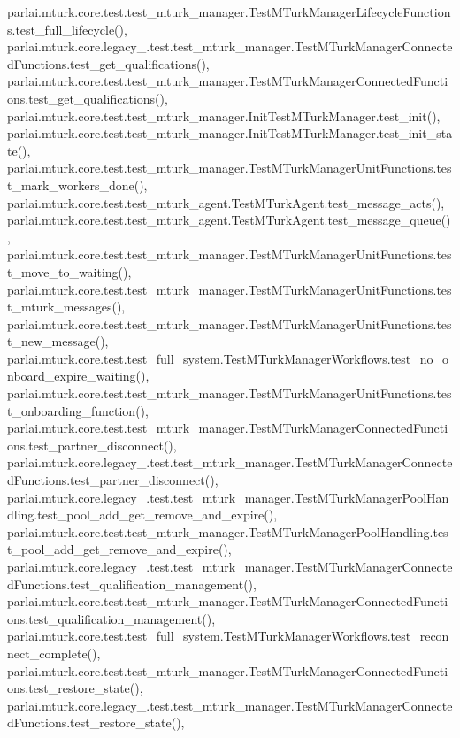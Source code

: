 parlai.\+mturk.\+core.\+test.\+test\+\_\+mturk\+\_\+manager.\+Test\+M\+Turk\+Manager\+Lifecycle\+Functions.\+test\+\_\+full\+\_\+lifecycle(), parlai.\+mturk.\+core.\+legacy\+\_.\+test.\+test\+\_\+mturk\+\_\+manager.\+Test\+M\+Turk\+Manager\+Connected\+Functions.\+test\+\_\+get\+\_\+qualifications(), parlai.\+mturk.\+core.\+test.\+test\+\_\+mturk\+\_\+manager.\+Test\+M\+Turk\+Manager\+Connected\+Functions.\+test\+\_\+get\+\_\+qualifications(), parlai.\+mturk.\+core.\+test.\+test\+\_\+mturk\+\_\+manager.\+Init\+Test\+M\+Turk\+Manager.\+test\+\_\+init(), parlai.\+mturk.\+core.\+test.\+test\+\_\+mturk\+\_\+manager.\+Init\+Test\+M\+Turk\+Manager.\+test\+\_\+init\+\_\+state(), parlai.\+mturk.\+core.\+test.\+test\+\_\+mturk\+\_\+manager.\+Test\+M\+Turk\+Manager\+Unit\+Functions.\+test\+\_\+mark\+\_\+workers\+\_\+done(), parlai.\+mturk.\+core.\+test.\+test\+\_\+mturk\+\_\+agent.\+Test\+M\+Turk\+Agent.\+test\+\_\+message\+\_\+acts(), parlai.\+mturk.\+core.\+test.\+test\+\_\+mturk\+\_\+agent.\+Test\+M\+Turk\+Agent.\+test\+\_\+message\+\_\+queue(), parlai.\+mturk.\+core.\+test.\+test\+\_\+mturk\+\_\+manager.\+Test\+M\+Turk\+Manager\+Unit\+Functions.\+test\+\_\+move\+\_\+to\+\_\+waiting(), parlai.\+mturk.\+core.\+test.\+test\+\_\+mturk\+\_\+manager.\+Test\+M\+Turk\+Manager\+Unit\+Functions.\+test\+\_\+mturk\+\_\+messages(), parlai.\+mturk.\+core.\+test.\+test\+\_\+mturk\+\_\+manager.\+Test\+M\+Turk\+Manager\+Unit\+Functions.\+test\+\_\+new\+\_\+message(), parlai.\+mturk.\+core.\+test.\+test\+\_\+full\+\_\+system.\+Test\+M\+Turk\+Manager\+Workflows.\+test\+\_\+no\+\_\+onboard\+\_\+expire\+\_\+waiting(), parlai.\+mturk.\+core.\+test.\+test\+\_\+mturk\+\_\+manager.\+Test\+M\+Turk\+Manager\+Unit\+Functions.\+test\+\_\+onboarding\+\_\+function(), parlai.\+mturk.\+core.\+test.\+test\+\_\+mturk\+\_\+manager.\+Test\+M\+Turk\+Manager\+Connected\+Functions.\+test\+\_\+partner\+\_\+disconnect(), parlai.\+mturk.\+core.\+legacy\+\_.\+test.\+test\+\_\+mturk\+\_\+manager.\+Test\+M\+Turk\+Manager\+Connected\+Functions.\+test\+\_\+partner\+\_\+disconnect(), parlai.\+mturk.\+core.\+legacy\+\_.\+test.\+test\+\_\+mturk\+\_\+manager.\+Test\+M\+Turk\+Manager\+Pool\+Handling.\+test\+\_\+pool\+\_\+add\+\_\+get\+\_\+remove\+\_\+and\+\_\+expire(), parlai.\+mturk.\+core.\+test.\+test\+\_\+mturk\+\_\+manager.\+Test\+M\+Turk\+Manager\+Pool\+Handling.\+test\+\_\+pool\+\_\+add\+\_\+get\+\_\+remove\+\_\+and\+\_\+expire(), parlai.\+mturk.\+core.\+legacy\+\_.\+test.\+test\+\_\+mturk\+\_\+manager.\+Test\+M\+Turk\+Manager\+Connected\+Functions.\+test\+\_\+qualification\+\_\+management(), parlai.\+mturk.\+core.\+test.\+test\+\_\+mturk\+\_\+manager.\+Test\+M\+Turk\+Manager\+Connected\+Functions.\+test\+\_\+qualification\+\_\+management(), parlai.\+mturk.\+core.\+test.\+test\+\_\+full\+\_\+system.\+Test\+M\+Turk\+Manager\+Workflows.\+test\+\_\+reconnect\+\_\+complete(), parlai.\+mturk.\+core.\+test.\+test\+\_\+mturk\+\_\+manager.\+Test\+M\+Turk\+Manager\+Connected\+Functions.\+test\+\_\+restore\+\_\+state(), parlai.\+mturk.\+core.\+legacy\+\_.\+test.\+test\+\_\+mturk\+\_\+manager.\+Test\+M\+Turk\+Manager\+Connected\+Functions.\+test\+\_\+restore\+\_\+state(), 